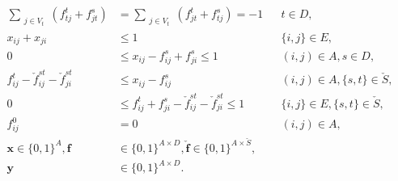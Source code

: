 \begin{subequations}
\begin{flalign}
		 	 \label{con:mfinpf2:flowDest}  \sum\limits_{\substack{j\in V_t}}(f^t_{tj}+f^s_{jt})&=\sum\limits_{\substack{j\in V_t}}(f^t_{jt}+f^s_{tj})  = -1     			&&  t \in D, &&\\	
		    \label{con:mfinpf2:zbound} x_{ij}+x_{ji}&\leq 1 &&\{i,j\}\in E, \\
  		    \label{con:mfinpf2:xbound} 0&\leq x_{ij}-f_{ij}^s+f_{ji}^s  \leq 1 && (i,j)\in A,  s\in D, \\
           \label{con:mfinpf2:fcap}   f^t_{ij} - \check{f}^{st}_{ij} - \check{f}^{st}_{ji} &\leq  x_{ij}-f^s_{ij}   && (i,j)\in A, \{s,t\}\in \check{S}, && &\\ 		 			 
\label{con:mfinpf2:fbound} 0&\leq f_{ij}^t+f_{ji}^s-\check{f}_{ij}^{st}-\check{f}_{ji}^{st}  \leq 1 && \{i,j\}\in E,\{s,t\}\in \check{S}, \\
\label{con:mfinpf2:fij00} f^0_{ij}&=0&&(i,j)\in A,\\
		    \label{con:mfinpf2:dim}	\mathbf{x} \in \{0,1\}^{A},\mathbf{f}&\in\{0,1\}^{A \times D},\mathbf{\check{f}}\in\{0,1\}^{A\times \check{S}}, \\ 
		    \label{con:mfinpf2:dimy}\mathbf{y}&\in \{0,1\}^{A\times D}.
    \end{flalign}
    \end{subequations}  

